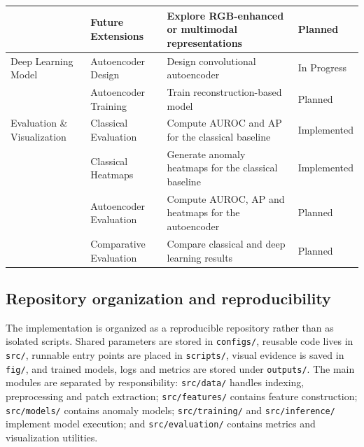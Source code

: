 \begin{table}[H]
\begin{tabularx}{\columnwidth}{|
>{\raggedright\arraybackslash}p{1.8cm}|
>{\raggedright\arraybackslash}p{2cm}|
X|
>{\centering\arraybackslash}p{1.4cm}|}
&
Future Extensions &
Explore RGB-enhanced or multimodal representations &
\cellcolor{planblue}Planned \\ \hline

Deep Learning Model &
Autoencoder Design &
Design convolutional autoencoder &
\cellcolor{progYellow}In Progress \\ \cline{2-4}

&
Autoencoder Training &
Train reconstruction-based model &
\cellcolor{planblue}Planned \\ \hline

Evaluation \& Visualization &
Classical Evaluation &
Compute AUROC and AP for the classical baseline &
\cellcolor{implgreen}Implemented \\ \cline{2-4}

&
Classical Heatmaps &
Generate anomaly heatmaps for the classical baseline &
\cellcolor{implgreen}Implemented \\ \cline{2-4}

&
Autoencoder Evaluation &
Compute AUROC, AP and heatmaps for the autoencoder &
\cellcolor{planblue}Planned \\ \cline{2-4}

&
Comparative Evaluation &
Compare classical and deep learning results &
\cellcolor{planblue}Planned \\ \hline

\end{tabularx}

\label{tab:implementation-status}
\end{table}

\subsection*{Repository organization and reproducibility}
The implementation is organized as a reproducible repository rather than as isolated scripts. Shared parameters are stored in \texttt{configs/}, reusable code lives in \texttt{src/}, runnable entry points are placed in \texttt{scripts/}, visual evidence is saved in \texttt{fig/}, and trained models, logs and metrics are stored under \texttt{outputs/}. The main modules are separated by responsibility: \texttt{src/data/} handles indexing, preprocessing and patch extraction; \texttt{src/features/} contains feature construction; \texttt{src/models/} contains anomaly models; \texttt{src/training/} and \texttt{src/inference/} implement model execution; and \texttt{src/evaluation/} contains metrics and visualization utilities.


